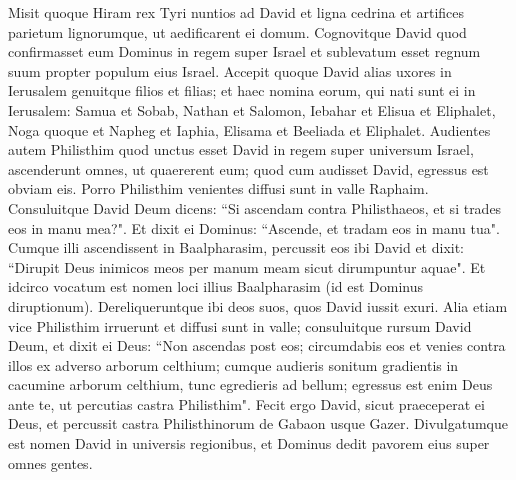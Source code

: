 \begin{biblechapter}  
\verse Misit quoque Hiram rex Tyri nuntios ad David et ligna cedrina et artifices parietum lignorumque, ut aedificarent ei domum. 
\verse Cognovitque David quod confirmasset eum Dominus in regem super Israel et sublevatum esset regnum suum propter populum eius Israel. 
\verse Accepit quoque David alias uxores in Ierusalem genuitque filios et filias;  
\verse et haec nomina eorum, qui nati sunt ei in Ierusalem: Samua et Sobab, Nathan et Salomon, 
\verse Iebahar et Elisua et Eliphalet, 
\verse Noga quoque et Napheg et Iaphia, 
\verse Elisama et Beeliada et Eliphalet. 
\verse Audientes autem Philisthim quod unctus esset David in regem super universum Israel, ascenderunt omnes, ut quaererent eum; quod cum audisset David, egressus est obviam eis. 
\verse Porro Philisthim venientes diffusi sunt in valle Raphaim.  
\verse Consuluitque David Deum dicens: “Si ascendam contra Philisthaeos, et si trades eos in manu mea?". Et dixit ei Dominus: “Ascende, et tradam eos in manu tua". 
\verse Cumque illi ascendissent in Baalpharasim, percussit eos ibi David et dixit: “Dirupit Deus inimicos meos per manum meam sicut dirumpuntur aquae". Et idcirco vocatum est nomen loci illius Baalpharasim (id est Dominus diruptionum). 
\verse Dereliqueruntque ibi deos suos, quos David iussit exuri. 
\verse Alia etiam vice Philisthim irruerunt et diffusi sunt in valle; 
\verse consuluitque rursum David Deum, et dixit ei Deus: “Non ascendas post eos; circumdabis eos et venies contra illos ex adverso arborum celthium; 
\verse cumque audieris sonitum gradientis in cacumine arborum celthium, tunc egredieris ad bellum; egressus est enim Deus ante te, ut percutias castra Philisthim".  
\verse Fecit ergo David, sicut praeceperat ei Deus, et percussit castra Philisthinorum de Gabaon usque Gazer. 
\verse Divulgatumque est nomen David in universis regionibus, et Dominus dedit pavorem eius super omnes gentes. 
\end{biblechapter}

